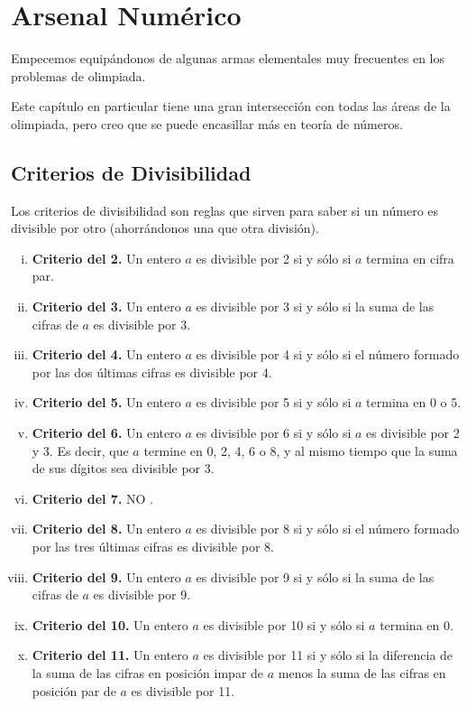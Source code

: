 \chapter{Arsenal Numérico}

Empecemos equipándonos de algunas armas elementales muy 
frecuentes en los problemas de olimpiada.

Este capítulo en particular tiene una gran intersección 
con todas las áreas de la olimpiada, pero creo que se puede 
encasillar más en teoría de números.

\section{Criterios de Divisibilidad}

Los criterios de divisibilidad son reglas que sirven para saber 
si un número es divisible por otro (ahorrándonos una 
que otra división).

\begin{enumerate}[i.]
    \item \textbf{Criterio del 2.} Un entero \( a \) es divisible 
    por 2 si y sólo si \( a \) termina en cifra par.
    \item \textbf{Criterio del 3.} Un entero \( a \) es divisible 
    por 3 si y sólo si la suma de las cifras de \( a \) es 
    divisible por 3.
    \item \textbf{Criterio del 4.} Un entero \( a \) es divisible 
    por 4 si y sólo si el número formado por las dos últimas cifras 
    es divisible por 4.
    \item \textbf{Criterio del 5.} Un entero \( a \) es divisible 
    por 5 si y sólo si \( a \) termina en 0 o 5.
    \item \textbf{Criterio del 6.} Un entero \( a \) es divisible 
    por 6 si y sólo si \( a \) es divisible por 2 y 3. Es decir, 
    que \( a \) termine en 0, 2, 4, 6 o 8, y al mismo tiempo que 
    la suma de sus dígitos sea divisible por 3.
    \item \textbf{Criterio del 7.} NO \minitisca.
    \item \textbf{Criterio del 8.} Un entero \( a \) es divisible 
    por 8 si y sólo si el número formado por las tres últimas 
    cifras es divisible por 8.
    \item \textbf{Criterio del 9.} Un entero \( a \) es divisible 
    por 9 si y sólo si la suma de las cifras de \( a \) es 
    divisible por 9.
    \item \textbf{Criterio del 10.} Un entero \( a \) es 
    divisible por 10 si y sólo si \( a \) termina en 0.
    \item \textbf{Criterio del 11.} Un entero \( a \) es 
    divisible por 11 si y sólo si la diferencia de la suma de 
    las cifras en posición impar de \( a \) menos la suma de las 
    cifras en posición par de \( a \) es divisible por 11.
\end{enumerate}

